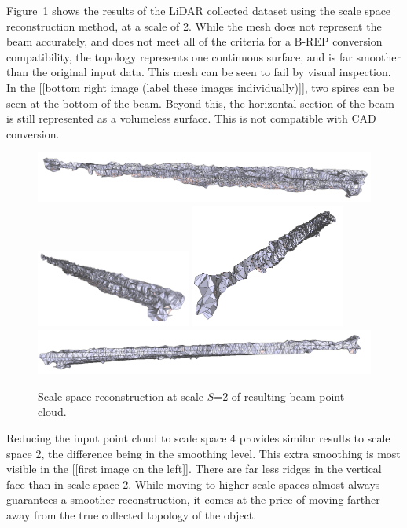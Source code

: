 \documentclass[12pt]{drexelthesis}
\begin{document}
Figure~\ref{lidar:scalespace2} shows the results of the LiDAR collected dataset using the scale space reconstruction method, at a scale of 2. While the mesh does not represent the beam accurately, and does not meet all of the criteria for a B-REP conversion compatibility, the topology represents one continuous surface, and is far smoother than the original input data. This mesh can be seen to fail by visual inspection. In the [[bottom right image (label these images individually)]], two spires can be seen at the bottom of the beam. Beyond this, the horizontal section of the beam is still represented as a volumeless surface. This is not compatible with CAD conversion.

\begin{figure}[!ht]
	\centering
		\includegraphics[width=5in]{real-lab-scans/meshedNeat/scalespace200.png}
		\includegraphics[width=2in]{real-lab-scans/meshedNeat/scalespace201.png}
		\includegraphics[width=2in]{real-lab-scans/meshedNeat/scalespace202.png}
		\includegraphics[width=5in]{real-lab-scans/meshedNeat/scalespace203.png}
		\caption[Scale space reconstruction at scale $S$=2 of segmented LiDAR data]{\centering Scale space reconstruction at scale $S$=2 of resulting beam point cloud.}
	\label{lidar:scalespace2}
\end{figure}

Reducing the input point cloud to scale space 4 provides similar results to scale space 2, the difference being in the smoothing level. This extra smoothing is most visible in the [[first image on the left]]. There are far less ridges in the vertical face than in scale space 2. While moving to higher scale spaces almost always guarantees a smoother reconstruction, it comes at the price of moving farther away from the true collected topology of the object.
\end{document}
